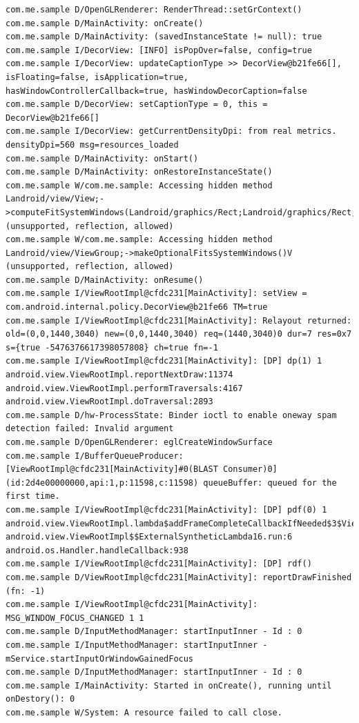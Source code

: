\documentclass[9pt, b5paper]{article}
\begin{document}
\begin{verbatim}
com.me.sample D/OpenGLRenderer: RenderThread::setGrContext()
com.me.sample D/MainActivity: onCreate() 
com.me.sample D/MainActivity: (savedInstanceState != null): true
com.me.sample I/DecorView: [INFO] isPopOver=false, config=true
com.me.sample I/DecorView: updateCaptionType >> DecorView@b21fe66[], isFloating=false, isApplication=true, hasWindowControllerCallback=true, hasWindowDecorCaption=false
com.me.sample D/DecorView: setCaptionType = 0, this = DecorView@b21fe66[]
com.me.sample I/DecorView: getCurrentDensityDpi: from real metrics. densityDpi=560 msg=resources_loaded
com.me.sample D/MainActivity: onStart() 
com.me.sample D/MainActivity: onRestoreInstanceState() 
com.me.sample W/com.me.sample: Accessing hidden method Landroid/view/View;->computeFitSystemWindows(Landroid/graphics/Rect;Landroid/graphics/Rect;)Z (unsupported, reflection, allowed)
com.me.sample W/com.me.sample: Accessing hidden method Landroid/view/ViewGroup;->makeOptionalFitsSystemWindows()V (unsupported, reflection, allowed)
com.me.sample D/MainActivity: onResume() 
com.me.sample I/ViewRootImpl@cfdc231[MainActivity]: setView = com.android.internal.policy.DecorView@b21fe66 TM=true
com.me.sample I/ViewRootImpl@cfdc231[MainActivity]: Relayout returned: old=(0,0,1440,3040) new=(0,0,1440,3040) req=(1440,3040)0 dur=7 res=0x7 s={true -5476376617398057808} ch=true fn=-1
com.me.sample I/ViewRootImpl@cfdc231[MainActivity]: [DP] dp(1) 1 android.view.ViewRootImpl.reportNextDraw:11374 android.view.ViewRootImpl.performTraversals:4167 android.view.ViewRootImpl.doTraversal:2893 
com.me.sample D/hw-ProcessState: Binder ioctl to enable oneway spam detection failed: Invalid argument
com.me.sample D/OpenGLRenderer: eglCreateWindowSurface
com.me.sample I/BufferQueueProducer: [ViewRootImpl@cfdc231[MainActivity]#0(BLAST Consumer)0](id:2d4e00000000,api:1,p:11598,c:11598) queueBuffer: queued for the first time.
com.me.sample I/ViewRootImpl@cfdc231[MainActivity]: [DP] pdf(0) 1 android.view.ViewRootImpl.lambda$addFrameCompleteCallbackIfNeeded$3$ViewRootImpl:4969 android.view.ViewRootImpl$$ExternalSyntheticLambda16.run:6 android.os.Handler.handleCallback:938 
com.me.sample I/ViewRootImpl@cfdc231[MainActivity]: [DP] rdf()
com.me.sample D/ViewRootImpl@cfdc231[MainActivity]: reportDrawFinished (fn: -1) 
com.me.sample I/ViewRootImpl@cfdc231[MainActivity]: MSG_WINDOW_FOCUS_CHANGED 1 1
com.me.sample D/InputMethodManager: startInputInner - Id : 0
com.me.sample I/InputMethodManager: startInputInner - mService.startInputOrWindowGainedFocus
com.me.sample D/InputMethodManager: startInputInner - Id : 0
com.me.sample I/MainActivity: Started in onCreate(), running until onDestory(): 0
com.me.sample W/System: A resource failed to call close.
\end{verbatim}
\end{document}
